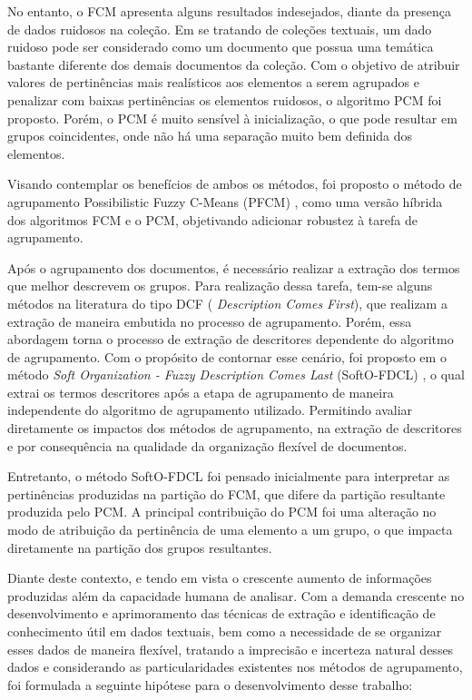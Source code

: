 No entanto, o FCM apresenta alguns resultados indesejados, diante da presença de dados ruidosos na
coleção. Em se tratando de coleções textuais, um dado ruidoso pode ser considerado como um
documento que possua uma temática bastante diferente dos demais documentos da coleção. Com o
objetivo de atribuir valores de pertinências mais realísticos aos elementos a serem agrupados e
penalizar com baixas pertinências os elementos ruidosos, o algoritmo PCM foi proposto. Porém, o PCM
é muito sensível à inicialização, o que pode resultar em grupos coincidentes, onde não há uma
separação muito bem definida dos elementos.

Visando contemplar os benefícios de ambos os métodos, foi proposto o método de agrupamento Possibilistic Fuzzy C-Means
(PFCM) \cite{Pal2005}, como uma versão híbrida dos algoritmos FCM e o PCM,
objetivando adicionar robustez à tarefa de agrupamento.

Após o agrupamento dos documentos, é necessário realizar a extração dos termos que melhor descrevem
os grupos. Para realização dessa tarefa, tem-se alguns métodos na literatura do tipo DCF ({\it
Description Comes First}), que realizam a extração de maneira embutida no processo de agrupamento.
Porém, essa abordagem torna o processo de extração de descritores dependente do algoritmo de
agrupamento. Com o propósito de contornar esse cenário, foi proposto em  o
método {\it Soft Organization - Fuzzy Description Comes Last} (SoftO-FDCL) \cite{Nogueira2013}, o qual extrai os termos descritores após a etapa de agrupamento de maneira independente do algoritmo de agrupamento utilizado. Permitindo avaliar diretamente os impactos dos métodos de agrupamento, na
extração de descritores e por consequência na qualidade da organização flexível de documentos.

Entretanto, o método SoftO-FDCL foi pensado inicialmente para interpretar as pertinências produzidas
na partição do FCM, que difere da partição resultante produzida pelo PCM. A principal contribuição
do PCM foi uma alteração no modo de atribuição da pertinência de uma elemento a um grupo, o que
impacta diretamente na partição dos grupos resultantes. 

Diante deste contexto, e tendo em vista o crescente aumento de informações produzidas além da capacidade humana de
analisar. Com a demanda crescente no desenvolvimento e aprimoramento das técnicas de extração e
identificação de conhecimento útil em dados textuais, bem como a necessidade de se organizar esses dados de
maneira flexível, tratando a imprecisão e incerteza natural desses dados e considerando as
particularidades existentes nos métodos de agrupamento, foi formulada a seguinte hipótese para o desenvolvimento desse trabalho:


